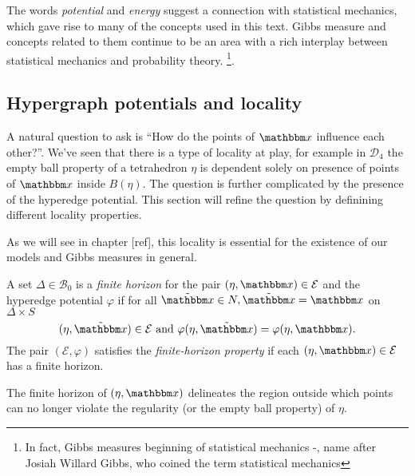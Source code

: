The words \textit{potential} and \textit{energy} suggest a connection with statistical mechanics, which gave rise to many of the concepts used in this text. Gibbs measure and concepts related to them continue to be an area with a rich interplay between statistical mechanics and probability theory. \footnote{In fact, Gibbs measures beginning of statistical mechanics -, name after Josiah Willard Gibbs, who coined the term statistical mechanics}.




\subsection{Hypergraph potentials and locality}
A natural question to ask is ``How do the points of $\x$ influence each other?''. We've seen that there is a type of locality at play, for example in $\mathcal D_4$ the empty ball property of a tetrahedron $\eta$ is dependent solely on presence of points of $\x$ inside $B(\eta)$. The question is further complicated by the presence of the hyperedge potential. This section will refine the question by definining different locality properties.

As we will see in chapter [ref], this locality is essential for the existence of our models and Gibbs measures in general.

\begin{definition}
	A set $\Delta \in \mathcal B_0$ is a \textit{finite horizon} for the pair $(\eta,\x) \in \mathcal E$ and the hyperedge potential $\varphi$ if for all $\tilde{\x} \in N, \tilde{\x} = \x$ on $\Delta\times S$ 
$$(\eta,\tilde{\x})\in\mathcal E \text{ and } \varphi(\eta,\tilde{\x}) = \varphi(\eta,\x). $$
The pair $(\mathcal E, \varphi)$ satisfies the \textit{finite-horizon property} if each $(\eta,\x)\in \mathcal E$ has a finite horizon.
\end{definition}

The finite horizon of $(\eta,\x)$ delineates the region outside which points can no longer violate the regularity (or the empty ball property) of $\eta$. 

